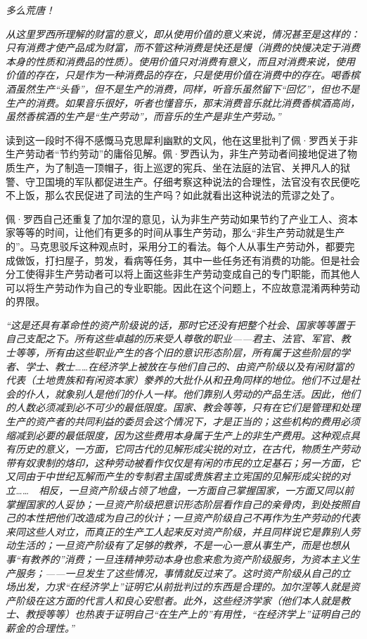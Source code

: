 \documentclass[a4paper]{article}
\begin{document}
\emph{多么荒唐！}

\emph{从这里罗西所理解的财富的意义，即从使用价值的意义来说，情况甚至是这样的：只有消费才使产品成为财富，而不管这种消费是快还是慢（消费的快慢决定于消费本身的性质和消费品的性质）。使用价值只对消费有意义，而且对消费来说，使用价值的存在，只是作为一种消费品的存在，只是使用价值在消费中的存在。喝香槟酒虽然生产“头昏”，但不是生产的消费，同样，听音乐虽然留下“回忆”，但也不是生产的消费。如果音乐很好，听者也懂音乐，那末消费音乐就比消费香槟酒高尚，虽然香槟酒的生产是“生产劳动”，而音乐的生产是非生产劳动。”}

读到这一段时不得不感慨马克思犀利幽默的文风，他在这里批判了佩·罗西关于非生产劳动者“节约劳动”的庸俗见解。佩·罗西认为，非生产劳动者间接地促进了物质生产，为了制造一顶帽子，街上巡逻的宪兵、坐在法庭的法官、关押凡人的狱警、守卫国境的军队都促进生产。仔细考察这种说法的合理性，法官没有农民便吃不上饭，那么农民促进了司法的生产吗？如此就看出这种说法的荒谬之处了。

佩·罗西自己还重复了加尔涅的意见，认为非生产劳动如果节约了产业工人、资本家等等的时间，让他们有更多的时间从事生产劳动，那么“非生产劳动就是生产的”。马克思驳斥这种观点时，采用分工的看法。每个人从事生产劳动外，都要完成做饭，打扫屋子，剪发，看病等任务，其中一些任务还有消费的功能。但是社会分工使得非生产劳动者可以将上面这些非生产劳动变成自己的专门职能，而其他人可以将生产劳动作为自己的专业职能。因此在这个问题上，不应故意混淆两种劳动的界限。

\emph{“这是还具有革命性的资产阶级说的话，那时它还没有把整个社会、国家等等置于自己支配之下。所有这些卓越的历来受人尊敬的职业——君主、法官、军官、教士等等，所有由这些职业产生的各个旧的意识形态阶层，所有属于这些阶层的学者、学士、教士……在经济学上被放在与他们自己的、由资产阶级以及有闲财富的代表（土地贵族和有闲资本家）豢养的大批仆从和丑角同样的地位。他们不过是社会的仆人，就象别人是他们的仆人一样。他们靠别人劳动的产品生活。因此，他们的人数必须减到必不可少的最低限度。国家、教会等等，只有在它们是管理和处理生产的资产者的共同利益的委员会这个情况下，才是正当的；这些机构的费用必须缩减到必要的最低限度，因为这些费用本身属于生产上的非生产费用。这种观点具有历史的意义，一方面，它同古代的见解形成尖锐的对立，在古代，物质生产劳动带有奴隶制的烙印，这种劳动被看作仅仅是有闲的市民的立足基石；另一方面，它又同由于中世纪瓦解而产生的专制君主国或贵族君主立宪国的见解形成尖锐的对立……　相反，一旦资产阶级占领了地盘，一方面自己掌握国家，一方面又同以前掌握国家的人妥协；一旦资产阶级把意识形态阶层看作自己的亲骨肉，到处按照自己的本性把他们改造成为自己的伙计；一旦资产阶级自己不再作为生产劳动的代表来同这些人对立，而真正的生产工人起来反对资产阶级，并且同样说它是靠别人劳动生活的；一旦资产阶级有了足够的教养，不是一心一意从事生产，而是也想从事“有教养的”消费；一旦连精神劳动本身也愈来愈为资产阶级服务，为资本主义生产服务；——一旦发生了这些情况，事情就反过来了。这时资产阶级从自己的立场出发，力求“在经济学上”证明它从前批判过的东西是合理的。加尔涅等人就是资产阶级在这方面的代言人和良心安慰者。此外，这些经济学家（他们本人就是教士、教授等等）也热衷于证明自己“在生产上的”有用性，“在经济学上”证明自己的薪金的合理性。”}
\end{document}
